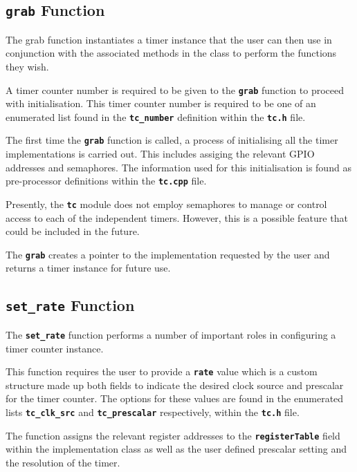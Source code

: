 \documentclass[a4paper, oneside, 11pt, titlepage, onecolumn, openright]{report}
\begin{document}
\subsection{\textbf{\texttt{grab}} Function}
			\label{ss:HALtcgrabFunction}
			The grab function instantiates a timer instance that the user can then use in conjunction with the associated methods in the class to perform the functions they wish.
			
			A timer counter number is required to be given to the \textbf{\texttt{grab}} function to proceed with initialisation. This timer counter number is required to be one of an enumerated list found in the \textbf{\texttt{tc\_number}} definition within the \textbf{\texttt{tc.h}} file. 
			
			The first time the \textbf{\texttt{grab}} function is called, a process of initialising all the timer implementations is carried out. This includes assiging the relevant GPIO addresses and semaphores. The information used for this initialisation is found as pre-processor definitions within the \textbf{\texttt{tc.cpp}} file.
			
			Presently, the \textbf{\texttt{tc}} module does not employ semaphores to manage or control access to each of the independent timers. However, this is a possible feature that could be included in the future.
			
			The \textbf{\texttt{grab}} creates a pointer to the implementation requested by the user and returns a timer instance for future use. 
			
\subsection{\textbf{\texttt{set\_rate}} Function}
			\label{ss:HALtcset_rateFunction}
			
			The \textbf{\texttt{set\_rate}} function performs a number of important roles in configuring a timer counter instance.
			
			This function requires the user to provide a \textbf{\texttt{rate}} value which is a custom structure made up both fields to indicate the desired clock source and prescalar for the timer counter. The options for these values are found in the enumerated lists \textbf{\texttt{tc\_clk\_src}} and \textbf{\texttt{tc\_prescalar}} respectively, within the \textbf{\texttt{tc.h}} file.
			
			The function assigns the relevant register addresses to the \textbf{\texttt{registerTable}} field within the implementation class as well as the user defined prescalar setting and the resolution of the timer.
			
\end{document}
